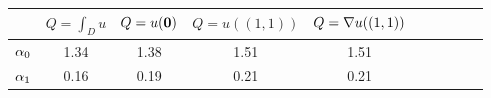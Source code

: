 \begin{tabular}{Sc Sc Sc Sc Sc}
\toprule
{} & $Q = \int_D u$ & $Q = u(\mathbf{0})$ & $Q = u((1,1))$ & $Q = \nabla u((1,1))$ \\
\midrule
$\alpha_{0}$ &           1.34 &            1.38 &           1.51 &                1.51 \\
$\alpha_{1}$ &           0.16 &            0.19 &           0.21 &                0.21 \\
\bottomrule
\end{tabular}
